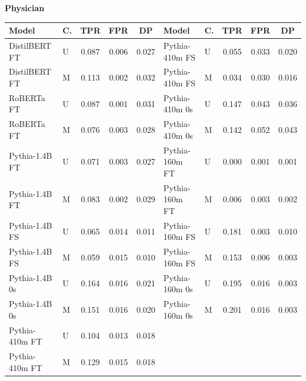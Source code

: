 \documentclass[11pt]{article}
\begin{document}
\vspace{4pt}\noindent\textbf{Physician}
\begin{center}\scriptsize
\begin{tabular}{llccc|llccc}
\toprule
\textbf{Model} & \textbf{C.} & \textbf{TPR} & \textbf{FPR} & \textbf{DP} & \textbf{Model} & \textbf{C.} & \textbf{TPR} & \textbf{FPR} & \textbf{DP} \\
\midrule
DistilBERT FT & U & 0.087 & 0.006 & 0.027 & Pythia-410m FS & U & 0.055 & 0.033 & 0.020 \\
DistilBERT FT & M & 0.113 & 0.002 & 0.032 & Pythia-410m FS & M & 0.034 & 0.030 & 0.016 \\
RoBERTa FT & U & 0.087 & 0.001 & 0.031 & Pythia-410m 0s & U & 0.147 & 0.043 & 0.036 \\
RoBERTa FT & M & 0.076 & 0.003 & 0.028 & Pythia-410m 0s & M & 0.142 & 0.052 & 0.043 \\
Pythia-1.4B FT & U & 0.071 & 0.003 & 0.027 & Pythia-160m FT & U & 0.000 & 0.001 & 0.001 \\
Pythia-1.4B FT & M & 0.083 & 0.002 & 0.029 & Pythia-160m FT & M & 0.006 & 0.003 & 0.002 \\
Pythia-1.4B FS & U & 0.065 & 0.014 & 0.011 & Pythia-160m FS & U & 0.181 & 0.003 & 0.010 \\
Pythia-1.4B FS & M & 0.059 & 0.015 & 0.010 & Pythia-160m FS & M & 0.153 & 0.006 & 0.003 \\
Pythia-1.4B 0s & U & 0.164 & 0.016 & 0.021 & Pythia-160m 0s & U & 0.195 & 0.016 & 0.003 \\
Pythia-1.4B 0s & M & 0.151 & 0.016 & 0.020 & Pythia-160m 0s & M & 0.201 & 0.016 & 0.003 \\
Pythia-410m FT & U & 0.104 & 0.013 & 0.018 & & & & & \\
Pythia-410m FT & M & 0.129 & 0.015 & 0.018 & & & & & \\
\bottomrule
\end{tabular}
\end{center}
\end{document}
